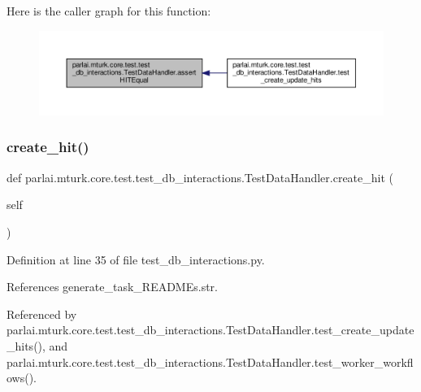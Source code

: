 Here is the caller graph for this function\+:
\nopagebreak
\begin{figure}[H]
\begin{center}
\leavevmode
\includegraphics[width=350pt]{classparlai_1_1mturk_1_1core_1_1test_1_1test__db__interactions_1_1TestDataHandler_ae22579287c9c54cf6c0a4dd3e87a7ada_icgraph}
\end{center}
\end{figure}
\mbox{\label{classparlai_1_1mturk_1_1core_1_1test_1_1test__db__interactions_1_1TestDataHandler_a7afbef0465fe007d9dccaabd8183d56f}} 
\subsubsection{\texorpdfstring{create\+\_\+hit()}{create\_hit()}}
{\footnotesize\ttfamily def parlai.\+mturk.\+core.\+test.\+test\+\_\+db\+\_\+interactions.\+Test\+Data\+Handler.\+create\+\_\+hit (\begin{DoxyParamCaption}\item[{}]{self }\end{DoxyParamCaption})}



Definition at line 35 of file test\+\_\+db\+\_\+interactions.\+py.



References generate\+\_\+task\+\_\+\+R\+E\+A\+D\+M\+Es.\+str.



Referenced by parlai.\+mturk.\+core.\+test.\+test\+\_\+db\+\_\+interactions.\+Test\+Data\+Handler.\+test\+\_\+create\+\_\+update\+\_\+hits(), and parlai.\+mturk.\+core.\+test.\+test\+\_\+db\+\_\+interactions.\+Test\+Data\+Handler.\+test\+\_\+worker\+\_\+workflows().

